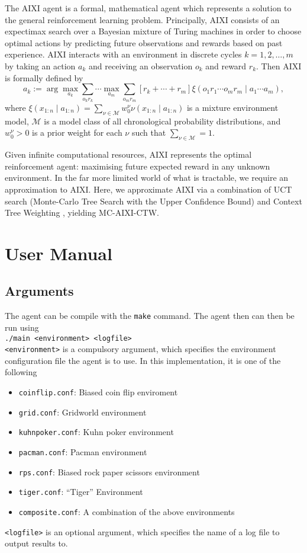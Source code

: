 \documentclass[pdftex,twoside,a4paper]{report}
\begin{document}
The AIXI agent is a formal, mathematical agent which represents a solution to
the general reinforcement learning problem. Principally, AIXI consists of an
expectimax search over a Bayesian mixture of Turing machines in order to
choose optimal actions by predicting future observations and rewards based on
past experience. AIXI interacts with an environment in discrete cycles $k = 1,
2, \dotsc, m$ by taking an action $a_k$ and receiving an
observation $o_k$ and reward $r_k$. Then AIXI is formally defined by
\[
  a_k := \arg\max_{a_k}\sum_{o_k r_k} \dotsb \max_{a_m} \sum_{o_m r_m} [r_k +
  \dotsb + r_m] \xi(o_1r_1 \dotsb o_mr_m \mid a_1 \dotsb a_m),
\]
where $\xi(x_{1:n} \mid a_{1:n}) = \sum_{\nu\in\mathcal{M}} w_0^\nu
\nu(x_{1:n} \mid a_{1:n})$ is a mixture environment model, $\mathcal{M}$ is a
model class of all chronological probability distributions, and $w_0^\nu > 0$
is a prior weight for each $\nu$ such that $\sum_{\nu\in\mathcal{M}} = 1$.

Given infinite computational resources, AIXI represents the optimal
reinforcement agent: maximising future expected reward in any unknown
environment.  In the far more limited world of what is tractable, we require
an approximation to AIXI. Here, we approximate AIXI via a combination of UCT
search (Monte-Carlo Tree Search with the Upper Confidence Bound)
\citep{kocsis2006bandit} and Context Tree Weighting
\citep{willems1995context}, yielding MC-AIXI-CTW.

\chapter{User Manual}
\section{Arguments}
The agent can be compile with the \texttt{make} command. The agent then can then be run using\\

\texttt{./main <environment> <logfile>}\\

\texttt{<environment>} is a compulsory argument, which specifies the environment configuration file the agent is to use. In this implementation, it is one of the following
\begin{itemize}
\item \texttt{coinflip.conf}: Biased coin flip enviroment
\item \texttt{grid.conf}: Gridworld environment
\item \texttt{kuhnpoker.conf}: Kuhn poker environment
\item \texttt{pacman.conf}: Pacman environment
\item \texttt{rps.conf}: Biased rock paper scissors environment
\item \texttt{tiger.conf}: ``Tiger'' Environment
\item \texttt{composite.conf}: A combination of the above environments
\end{itemize}
\texttt{<logfile>} is an optional argument, which specifies the name of a log file to output results to.
\newline
\end{document}
